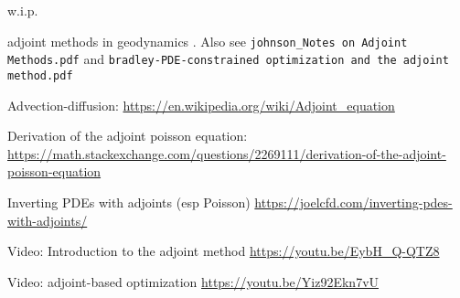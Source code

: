 
w.i.p.

adjoint methods in geodynamics \cite{bugs09,ghbu16,hobo14,isks07,ligs17,wahg15,wama09,wosp14}.
Also see {\tt johnson\_Notes on Adjoint Methods.pdf} and {\tt bradley-PDE-constrained optimization and the adjoint method.pdf} 

Advection-diffusion: \url{https://en.wikipedia.org/wiki/Adjoint_equation}

Derivation of the adjoint poisson equation: \url{https://math.stackexchange.com/questions/2269111/derivation-of-the-adjoint-poisson-equation}

Inverting PDEs with adjoints (esp Poisson) \url{https://joelcfd.com/inverting-pdes-with-adjoints/}

Video: Introduction to the adjoint method \url{https://youtu.be/EybH_Q-QTZ8}

Video: adjoint-based optimization \url{https://youtu.be/Yiz92Ekn7vU}
